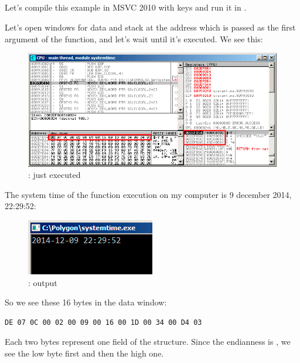 ﻿\clearpage
\subsection{\olly}
\myindex{\olly}

Let's compile this example in MSVC 2010 with  keys and run it in \olly.

Let's open windows for data and stack at the address which is passed as the first argument of the
 function, and let's wait until it's executed. We see this:

\begin{figure}[H]
\centering
\includegraphics[scale=\FigScale]{patterns/15_structs/1_systemtime/olly_systemtime1.png}
\caption{\olly:  just executed}
\label{fig:struct_olly_1}
\end{figure}

The system time of the function execution on my computer is 9 december 2014, 22:29:52:

\begin{figure}[H]
\centering
\includegraphics[scale=\NormalScale]{patterns/15_structs/1_systemtime/olly_systemtime2.png}
\caption{\olly: \printf output}
\label{fig:struct_olly_2}
\end{figure}

So we see these 16 bytes in the
data window: 
\begin{lstlisting}
DE 07 0C 00 02 00 09 00 16 00 1D 00 34 00 D4 03
\end{lstlisting}

Each two bytes represent one field of the structure. 
Since the \gls{endianness} is , 
we see the low byte first and then the high one.

